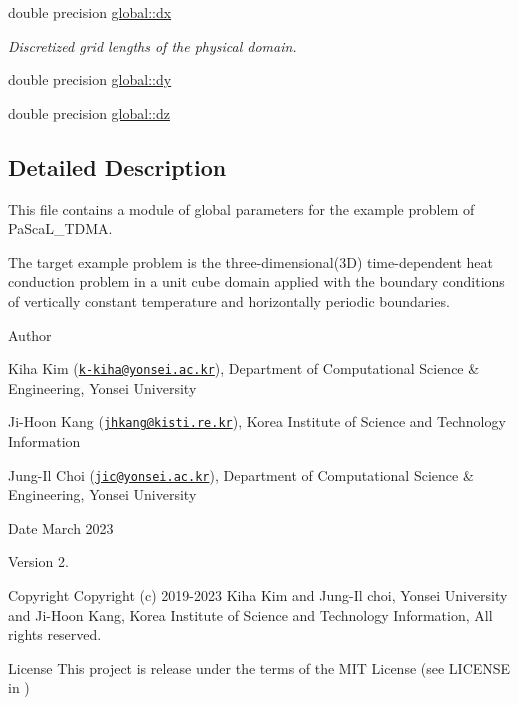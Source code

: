 \textbf{ }\par
\begin{DoxyCompactItemize}
\item 
double precision \hyperlink{namespaceglobal_a9c5f8c3cf5f9b496608059fc13776b4c}{global\+::dx}
\begin{DoxyCompactList}\small\item\em Discretized grid lengths of the physical domain. \end{DoxyCompactList}\item 
double precision \hyperlink{namespaceglobal_aa2d01c0b9c06af88ae13136658fc3dd9}{global\+::dy}
\item 
double precision \hyperlink{namespaceglobal_a4015487c561985eefa8cabc39f591540}{global\+::dz}
\end{DoxyCompactItemize}



\subsection{Detailed Description}
This file contains a module of global parameters for the example problem of Pa\+Sca\+L\+\_\+\+T\+D\+MA. 

The target example problem is the three-\/dimensional(3D) time-\/dependent heat conduction problem in a unit cube domain applied with the boundary conditions of vertically constant temperature and horizontally periodic boundaries. \begin{DoxyAuthor}{Author}

\begin{DoxyItemize}
\item Kiha Kim (\href{mailto:k-kiha@yonsei.ac.kr}{\tt k-\/kiha@yonsei.\+ac.\+kr}), Department of Computational Science \& Engineering, Yonsei University
\item Ji-\/\+Hoon Kang (\href{mailto:jhkang@kisti.re.kr}{\tt jhkang@kisti.\+re.\+kr}), Korea Institute of Science and Technology Information
\item Jung-\/\+Il Choi (\href{mailto:jic@yonsei.ac.kr}{\tt jic@yonsei.\+ac.\+kr}), Department of Computational Science \& Engineering, Yonsei University
\end{DoxyItemize}
\end{DoxyAuthor}
\begin{DoxyDate}{Date}
March 2023 
\end{DoxyDate}
\begin{DoxyVersion}{Version}
2. 
\end{DoxyVersion}
\begin{DoxyParagraph}{Copyright}
Copyright (c) 2019-\/2023 Kiha Kim and Jung-\/\+Il choi, Yonsei University and Ji-\/\+Hoon Kang, Korea Institute of Science and Technology Information, All rights reserved. 
\end{DoxyParagraph}
\begin{DoxyParagraph}{License }
This project is release under the terms of the M\+IT License (see L\+I\+C\+E\+N\+SE in ) 
\end{DoxyParagraph}
